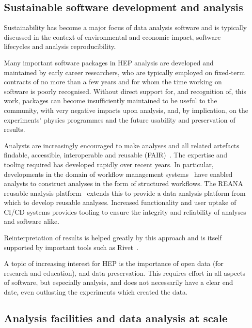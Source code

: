 \documentclass[10pt,a4paper]{article}
\begin{document}
\subsection{Sustainable software development and
analysis}\label{sustainable-software-development-and-analysis}

Sustainability has become a major focus of data analysis software and is
typically discussed in the context of environmental and economic impact,
software lifecycles and analysis reproducibility.

Many important software packages in HEP analysis are developed and
maintained by early career researchers, who are typically employed on
fixed-term contracts of no more than a few years and for whom the time
working on software is poorly recognised. Without direct support for,
and recognition of, this work, packages can become insufficiently
maintained to be useful to the community, with very negative
impacts upon analysis, and, by implication, on the experiments' physics
programmes and the future usability and preservation of results.

Analysts are increasingly encouraged to make analyses and all related artefacts
findable, accessible, interoperable and reusable
(FAIR)~\cite{wilkinson_fair_2016, Chen_2022, Duarte:2022job, FAIR4AIWorkshop}. The
expertise and tooling required has developed rapidly over recent years. In
particular, developments in the domain of workflow management
systems~\cite{cwl,snakemake,luigilaw,yadage} have enabled analysts to construct
analyses in the form of structured workflows. The REANA reusable analysis
platform~\cite{REANA} extends this to provide a data analysis platform from
which to develop reusable analyses. Increased functionality and user uptake of
CI/CD systems provides tooling to ensure the integrity and reliability of
analyses and software alike.

Reinterpretation of results is helped greatly by this approach and is itself
supported by important tools such as Rivet~\cite{10.21468/SciPostPhys.8.2.026}.

A topic of increasing interest for HEP is the importance of open data
(for research and education), and data preservation. This requires
effort in all aspects of software, but especially analysis, and does
not necessarily have a clear end date, even outlasting the experiments which
created the data.

\subsection{Analysis facilities and data analysis at
scale}\label{analysis-facilities-and-data-analysis-at-scale}
\end{document}
